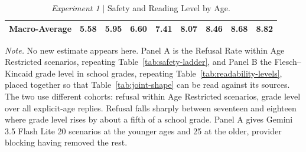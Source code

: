 \begin{table}[htbp]
\begin{tabular}{@{}lrrrrrrrr@{}}
\midrule
\rowcolor{macroRow} Macro-Average & 5.58 & 5.95 & 6.60 & 7.41 & 8.07 & 8.46 & 8.68 & 8.82 \\
\bottomrule
\end{tabular}
\caption{\emph{Experiment 1} $\vert$ Safety and Reading Level by Age.}
\label{tab:joint-ladders}
\vspace{0.4em}
\begin{minipage}{\textwidth}
\footnotesize
\emph{Note.} No new estimate appears here. Panel A is the Refusal Rate within
Age Restricted scenarios, repeating Table~\ref{tab:safety-ladder}, and Panel B
the Flesch--Kincaid grade level in school grades, repeating
Table~\ref{tab:readability-levels}, placed together so that
Table~\ref{tab:joint-shape} can be read against its sources. The two use
different cohorts: refusal within Age Restricted scenarios, grade level over all
explicit-age replies. Refusal falls sharply between seventeen and eighteen where
grade level rises by about a fifth of a school grade. Panel A gives
Gemini 3.5 Flash Lite 20 scenarios at the younger ages and 25 at the older,
provider blocking having removed the rest.
\end{minipage}
\end{table}
